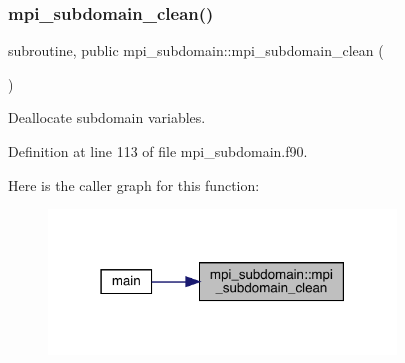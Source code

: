 \subsubsection{\texorpdfstring{mpi\_subdomain\_clean()}{mpi\_subdomain\_clean()}}
{\footnotesize\ttfamily subroutine, public mpi\+\_\+subdomain\+::mpi\+\_\+subdomain\+\_\+clean (\begin{DoxyParamCaption}{ }\end{DoxyParamCaption})}



Deallocate subdomain variables. 



Definition at line 113 of file mpi\+\_\+subdomain.\+f90.

Here is the caller graph for this function\+:
\nopagebreak
\begin{figure}[H]
\begin{center}
\leavevmode
\includegraphics[width=262pt]{namespacempi__subdomain_a56e9f2afd59e45fcada0f1c21a90eefe_icgraph}
\end{center}
\end{figure}
\mbox{\label{namespacempi__subdomain_a2e34a77537009dd448375e8fdc8d5b62}} 
